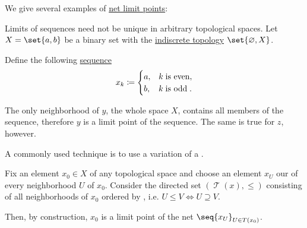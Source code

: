 \begin{example}\label{ex:def:net_limit_point}
  We give several examples of \hyperref[def:net_limit_point]{net limit points}:

  \begin{thmenum}
     Limits of sequences need not be unique in arbitrary topological spaces. Let \( X = \set{ a, b } \) be a binary set with the \hyperref[def:indiscrete_topology]{indiscrete topology} \( \set{ \varnothing, X } \).

    Define the following \hyperref[def:sequence]{sequence}
    \begin{equation*}
      x_k \coloneqq \begin{cases}
        a, &k \T{is even}, \\
        b, &k \T{is odd}.
      \end{cases}
    \end{equation*}

    The only neighborhood of \( y \), the whole space \( X \), contains all members of the sequence, therefore \( y \) is a limit point of the sequence. The same is true for \( z \), however.

     A commonly used technique is to use a variation of a .

    Fix an element \( x_0 \in X \) of any topological space and choose an element \( x_U \) our of every neighborhood \( U \) of \( x_0 \). Consider the directed set \( (\mscrT(x), \leq) \) consisting of all neighborhoods of \( x_0 \) ordered by , i.e. \( U \leq V \iff U \supseteq V \).

    Then, by construction, \( x_0 \) is a limit point of the net \( \seq{ x_U }_{U \in T(x_0)} \).
  \end{thmenum}
\end{example}

